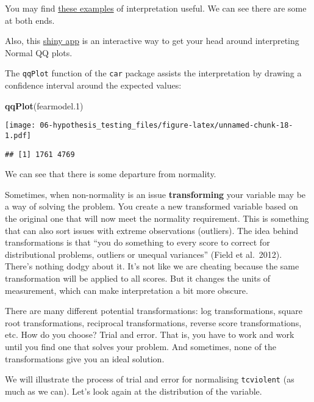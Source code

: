 \documentclass[
]{book}
\newenvironment{Shaded}{\begin{snugshade}}{\end{snugshade}}
\newcommand{\FloatTok}[1]{\textcolor[rgb]{0.00,0.00,0.81}{#1}}
\newcommand{\FunctionTok}[1]{\textcolor[rgb]{0.13,0.29,0.53}{\textbf{#1}}}
\newcommand{\NormalTok}[1]{#1}
\begin{document}
You may find \href{https://seankross.com/2016/02/29/A-Q-Q-Plot-Dissection-Kit.html}{these examples} of interpretation useful. We can see there are some at both ends.

Also, this \href{https://xiongge.shinyapps.io/QQplots/}{shiny app} is an interactive way to get your head around interpreting Normal QQ plots.

The \texttt{qqPlot} function of the \texttt{car} package assists the interpretation by drawing a confidence interval around the expected values:

\begin{Shaded}
\begin{Highlighting}[]
\FunctionTok{qqPlot}\NormalTok{(fearmodel}\FloatTok{.1}\NormalTok{)}
\end{Highlighting}
\end{Shaded}

\texttt{[image: 06-hypothesis\_testing\_files/figure-latex/unnamed-chunk-18-1.pdf]}

\begin{verbatim}
## [1] 1761 4769
\end{verbatim}

We can see that there is some departure from normality.

Sometimes, when non-normality is an issue \textbf{transforming} your variable may be a way of solving the problem. You create a new transformed variable based on the original one that will now meet the normality requirement. This is something that can also sort issues with extreme observations (outliers). The idea behind transformations is that ``you do something to every score to correct for distributional problems, outliers or unequal variances'' (Field et al.~2012). There's nothing dodgy about it. It's not like we are cheating because the same transformation will be applied to all scores. But it changes the units of measurement, which can make interpretation a bit more obscure.

There are many different potential transformations: log transformations, square root transformations, reciprocal transformations, reverse score transformations, etc. How do you choose? Trial and error. That is, you have to work and work until you find one that solves your problem. And sometimes, none of the transformations give you an ideal solution.

We will illustrate the process of trial and error for normalising \texttt{tcviolent} (as much as we can). Let's look again at the distribution of the variable.
\end{document}
